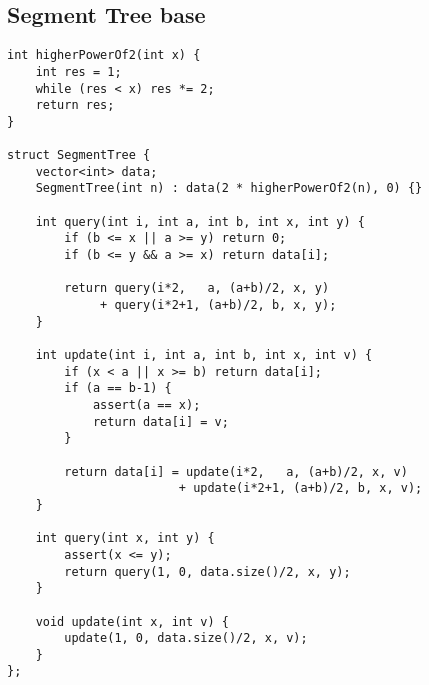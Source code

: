 \documentclass{article}
\begin{document}
\subsection{Segment Tree base}
\begin{lstlisting}
int higherPowerOf2(int x) {
    int res = 1;
    while (res < x) res *= 2;
    return res;
}

struct SegmentTree {
    vector<int> data;
    SegmentTree(int n) : data(2 * higherPowerOf2(n), 0) {}

    int query(int i, int a, int b, int x, int y) {
        if (b <= x || a >= y) return 0;
        if (b <= y && a >= x) return data[i];

        return query(i*2,   a, (a+b)/2, x, y)
             + query(i*2+1, (a+b)/2, b, x, y);
    }

    int update(int i, int a, int b, int x, int v) {
        if (x < a || x >= b) return data[i];
        if (a == b-1) {
            assert(a == x);
            return data[i] = v;
        }

        return data[i] = update(i*2,   a, (a+b)/2, x, v)
                        + update(i*2+1, (a+b)/2, b, x, v);
    }

    int query(int x, int y) {
        assert(x <= y);
        return query(1, 0, data.size()/2, x, y);
    }

    void update(int x, int v) {
        update(1, 0, data.size()/2, x, v);
    }
};
\end{lstlisting}
\end{document}
